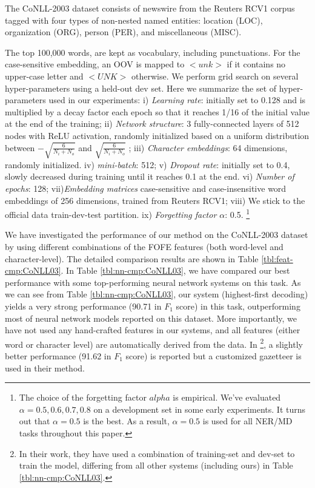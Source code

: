 \documentclass[11pt,a4paper]{article}
\begin{document}
The CoNLL-2003 dataset \cite{tjong2003introduction} consists of newswire from the Reuters RCV1 corpus tagged with four types of non-nested named entities: location (LOC), organization (ORG), person (PER), and miscellaneous (MISC).

The top 100,000 words, are kept as vocabulary, including punctuations. For the case-sensitive embedding, an OOV is mapped to $<unk>$ if it contains no upper-case letter and $<UNK>$ otherwise. We perform grid search on several hyper-parameters using a held-out dev set. Here we summarize the set of hyper-parameters used in our experiments:
i) {\it Learning rate}: initially set to 0.128 and is multiplied by a decay factor each epoch so that it reaches 1/16 of the initial value at the end of the training;
ii) {\it Network structure}: 3 fully-connected layers of 512 nodes with ReLU activation, randomly initialized based on a uniform distribution between $-\sqrt{\frac{6}{N_i + N_o}}$  and $\sqrt{\frac{6}{N_i + N_o}}$ \cite{glorot2011deep};
iii) {\it Character embeddings}: 64 dimensions, randomly initialized.
iv) {\it mini-batch}: 512;
v) {\it Dropout rate}: initially set to 0.4, slowly decreased during training until it reaches 0.1 at the end.
vi) {\it Number of epochs}: 128;
vii){\it Embedding matrices} case-sensitive and case-insensitive word embeddings of 256 dimensions, trained from Reuters RCV1;
viii) We stick to the official data train-dev-test partition. ix) {\it Forgetting factor $\alpha$}: 0.5. \footnote{The choice of the forgetting factor $alpha$ is empirical. We've evaluated $\alpha = 0.5,0.6,0.7,0.8$ on a development set in some early experiments. It turns out that $\alpha = 0.5$ is the best. As a result, $\alpha = 0.5$ is used for all NER/MD tasks throughout this paper.}

We have investigated the performance of our method on the CoNLL-2003 dataset by using different combinations of the FOFE features (both word-level and character-level). The detailed comparison results are shown in Table \ref{tbl:feat-cmp:CoNLL03}. In Table \ref{tbl:nn-cmp:CoNLL03}, we have compared our best performance with some top-performing neural network systems on this task. As we can see from Table \ref{tbl:nn-cmp:CoNLL03}, our system (highest-first decoding) yields a very strong performance (90.71 in $F_1$ score) in this task, outperforming most of neural network models reported on this dataset. More importantly, we have not used any hand-crafted features in our systems, and all features (either word or character level) are automatically derived from the data. 
In \cite{chiu2016named}\footnote{In their work, they have used a combination of training-set and dev-set to train the model, differing from all other systems (including ours) in Table \ref{tbl:nn-cmp:CoNLL03}.}, a slightly better performance (91.62 in $F_1$ score) is reported but a customized gazetteer is used in their method.
\end{document}
